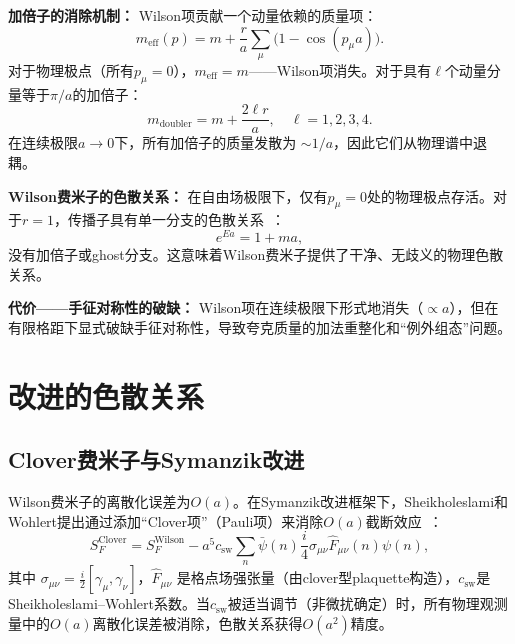 \documentclass[12pt,a4paper]{ctexart}
\theoremstyle{definition}
\begin{document}
\textbf{加倍子的消除机制：} Wilson项贡献一个动量依赖的质量项：
\begin{equation}
    m_{\text{eff}}(p) = m + \frac{r}{a}\sum_{\mu} \bigl(1 - \cos(p_\mu a)\bigr).
\end{equation}
对于物理极点（所有$p_\mu = 0$），$m_{\text{eff}} = m$——Wilson项消失。对于具有$\ell$个动量分量等于$\pi/a$的加倍子：
\begin{equation}\label{eq:doubler_mass}
    m_{\text{doubler}} = m + \frac{2\ell r}{a}, \quad \ell = 1, 2, 3, 4.
\end{equation}
在连续极限$a \to 0$下，所有加倍子的质量发散为 $\sim 1/a$，因此它们从物理谱中退耦。

\textbf{Wilson费米子的色散关系：} 在自由场极限下，仅有$p_\mu = 0$处的物理极点存活。对于$r=1$，传播子具有单一分支的色散关系~\cite{fermionFormulations2026}：
\begin{equation}\label{eq:wilson_disp}
    e^{Ea} = 1 + ma,
\end{equation}
没有加倍子或ghost分支。这意味着Wilson费米子提供了干净、无歧义的物理色散关系。

\textbf{代价——手征对称性的破缺：} Wilson项在连续极限下形式地消失（$\propto a$），但在有限格距下显式破缺手征对称性，导致夸克质量的加法重整化和``例外组态''问题。

\section{改进的色散关系}

\subsection{Clover费米子与Symanzik改进}

Wilson费米子的离散化误差为$O(a)$。在Symanzik改进框架下，Sheikholeslami和Wohlert提出通过添加``Clover项''（Pauli项）来消除$O(a)$截断效应~\cite{GattringerLang2010}：
\begin{equation}
    S_F^{\text{Clover}} = S_F^{\text{Wilson}} - a^5 c_{\text{sw}} \sum_n \bar{\psi}(n) \frac{i}{4}\sigma_{\mu\nu} \hat{F}_{\mu\nu}(n) \psi(n),
\end{equation}
其中 $\sigma_{\mu\nu} = \frac{i}{2}[\gamma_\mu, \gamma_\nu]$，$\hat{F}_{\mu\nu}$ 是格点场强张量（由clover型plaquette构造），$c_{\text{sw}}$是Sheikholeslami--Wohlert系数。当$c_{\text{sw}}$被适当调节（非微扰确定）时，所有物理观测量中的$O(a)$离散化误差被消除，色散关系获得$O(a^2)$精度。
\end{document}
